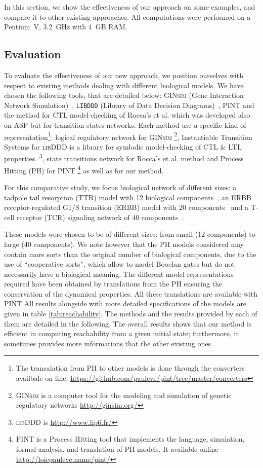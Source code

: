 In this section, we show the effectiveness of our approach on some examples,
and compare it to other existing approaches.
All computations were performed on a Pentium~V, 3.2~GHz with 4~GB RAM.

\subsection{Evaluation}
To evaluate the effectiveness of our new approach,
we position ourselves with respect to existing methods dealing with different biological models.
We have chosen the following tools, that are detailed below: 
\textsc{GINsim} (Gene Interaction Network Simulation)~\cite{gonzalez2006ginsim,naldi2009logical,naldi2007decision},
\texttt{LIBDDD} (Library of Data Decision Diagrams)~\cite{thierry2009hierarchical,colange2013towards},  PINT \cite{PMR12-MSCS} and the method for CTL model-checking of Rocca's et al. \cite{roccaasp} which was developed also on ASP but for transition states networks.
Each method use a specific kind of representation\footnote{The transalation from PH to other models is done through the converters availbale on line: \url{https://github.com/pauleve/pint/tree/master/converters}}:
logical regulatory network for \textsc{GINsim} \footnote{\textsc{GINsim} is a computer tool for the modeling and simulation of genetic regulatory networks \url{http://ginsim.org/} },
Instantiable Transition Systems for \textsc{libDDD} is a library for symbolic model-checking of CTL \& LTL properties. \footnote{\textsc{libDDD} is \url{http://www.lip6.fr/} },
state transitions network for Rocca's et al. method
and Process Hitting (PH) for \textsc{PINT} \footnote{\textsc{PINT} is a Process Hitting tool that implements the language, simulation, formal analysis, and translation of PH models. It available online \url{http://loicpauleve.name/pint/} } as well as for our method.

For this comparative study, we focus biological network of different sizes:
a tadpole tail resorption (TTR) model with 12 biological components~\cite{khalis2009smbionet},
an ERBB receptor-regulated G1/S transition (ERBB) model with 20 components~\cite{Samaga2009}
and a T-cell receptor (TCR) signaling network of 40 components~\cite{Klamt06}.

These models were chosen to be of different sizes:
from small (12 components) to large (40 components).
We note however that the PH models considered may contain more sorts than
the original number of biological components, due to the use of
“cooperative sorts”, which allow to model Booelan gates but do not necessarily
have a biological meaning.
The different model representations required have been obtained by translations
from the PH
ensuring the conservation of the dynamical properties.
All these translations are available with \textsc{PINT} 
All results alongside with more detailed specifications of the models
are given in table \ref{tab:reachability}.
The methods and the results provided by each of them are detailed in the following.
The overall results shows that our method is efficient in computing reachability
from a given initial state;
furthermore, it sometimes provides more informations that the other existing ones.

